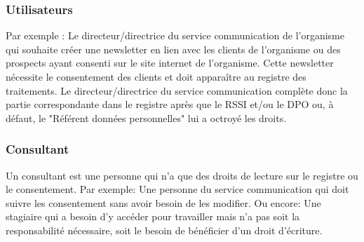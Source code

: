 \documentclass[12pt, a4paper]{report}
\begin{document}
    \subsubsection{Utilisateurs}
        Par exemple : Le directeur/directrice du service communication de l'organisme qui souhaite créer une newsletter en lien avec les clients de l'organisme ou des prospects ayant consenti sur le site internet de l'organisme.\newline
        Cette newsletter nécessite le consentement des clients et doit apparaître au registre des traitements.\newline
        Le directeur/directrice du service communication complète donc la partie correspondante dans le registre après que le RSSI et/ou le DPO ou, à défaut, le "Référent données personnelles" lui a octroyé les droits.
    \subsubsection{Consultant}
        Un consultant est une personne qui n'a que des droits de lecture sur le registre ou le consentement.\newline
        Par exemple: Une personne du service communication qui doit suivre les consentement sans avoir besoin de les modifier.\newline
        Ou encore: Une stagiaire qui a besoin d'y accéder pour travailler mais n'a pas soit la responsabilité nécessaire, soit le besoin de bénéficier d'un droit d'écriture.\newline
\end{document}
